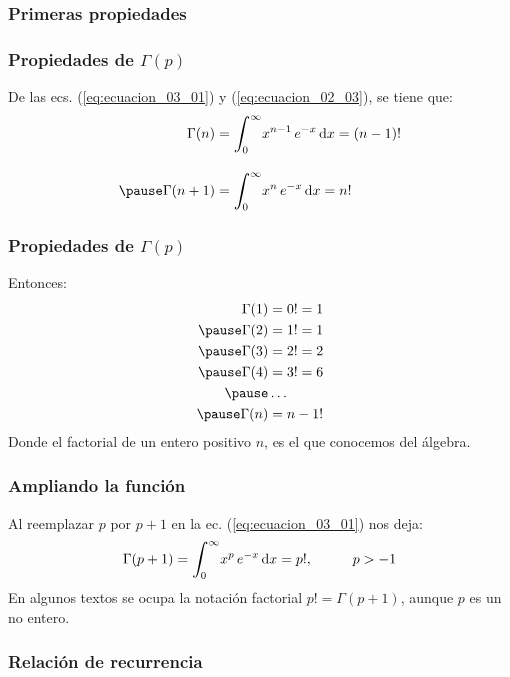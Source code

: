 \documentclass[12pt]{beamer}
\begin{document}
\subsubsection{Primeras propiedades}

\begin{frame}
\frametitle{Propiedades de $\Gamma (p)$}
De las ecs. (\ref{eq:ecuacion_03_01}) y (\ref{eq:ecuacion_02_03}), se tiene que:
\pause
\begin{eqnarray}
\begin{aligned}
\Gamma (n) &= \scaleint{6ex}_{\bs 0}^{\infty} x^{n-1} \, e^{-x} \dd{x} = (n -1)! \\[1em] \pause
\Gamma (n+1) &= \scaleint{6ex}_{\bs 0}^{\infty} x^{n} \, e^{-x} \dd{x} = n!
\end{aligned}
\label{eq:ecuacion_03_02}
\end{eqnarray}
\end{frame}
\begin{frame}
\frametitle{Propiedades de $\Gamma (p)$}
Entonces:
\pause
\begin{eqnarray*}
\Gamma (1) &= 0! = 1 \\ \pause
\Gamma (2) &= 1! = 1 \\ \pause
\Gamma (3) &= 2! = 2 \\ \pause
\Gamma (4) &= 3! = 6 \\ \pause
&\ldots \\ \pause
\Gamma (n) &= n-1!
\end{eqnarray*}
Donde el factorial de un entero positivo $n$, es el que conocemos del álgebra.
\end{frame}
\begin{frame}
\frametitle{Ampliando la función}
Al reemplazar $p$ por $p+1$ en la ec. (\ref{eq:ecuacion_03_01}) nos deja:
\pause
\begin{align}
\Gamma (p + 1) = \scaleint{6ex}_{\bs 0}^{\infty} x^{p} \, e^{-x} \dd{x} = p!, \hspace{1cm} p > -1
\label{eq:ecuacion_03_03}
\end{align}
En algunos textos se ocupa la notación factorial $p! = \Gamma (p + 1)$, aunque $p$ es un no entero.
\end{frame}

\subsubsection{Relación de recurrencia}
\end{document}
